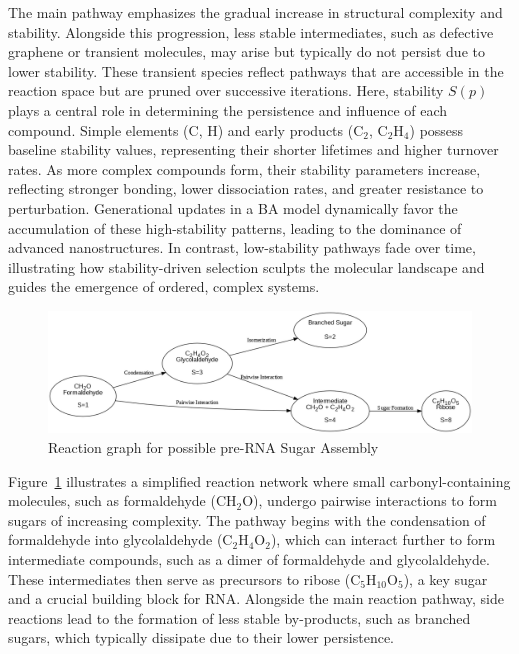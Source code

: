 \documentclass[entropy,article,submit,pdftex,moreauthors]{Definitions/mdpi}
\begin{document}
The main pathway emphasizes the gradual increase in structural complexity and stability. Alongside this progression, less stable intermediates, such as defective graphene or transient molecules, may arise but typically do not persist due to lower stability. These transient species reflect pathways that are accessible in the reaction space but are pruned over successive iterations. Here, stability \( S(p) \) plays a central role in determining the persistence and influence of each compound. Simple elements (\( \text{C} \), \( \text{H} \)) and early products (\( \text{C}_2 \), \( \text{C}_2\text{H}_4 \)) possess baseline stability values, representing their shorter lifetimes and higher turnover rates. As more complex compounds form, their stability parameters increase, reflecting stronger bonding, lower dissociation rates, and greater resistance to perturbation. Generational updates in a BA model dynamically favor the accumulation of these high-stability patterns, leading to the dominance of advanced nanostructures. In contrast, low-stability pathways fade over time, illustrating how stability-driven selection sculpts the molecular landscape and guides the emergence of ordered, complex systems.


\begin{figure}[h]
    \centering
    \includegraphics[width=1\textwidth,height=0.4\textwidth]{abc_prerna.png}
    \caption{Reaction graph for possible pre-RNA Sugar Assembly}
    \label{fig:abc_prerna}
\end{figure}

Figure~\ref{fig:abc_prerna} illustrates a simplified reaction network where small carbonyl-containing molecules, such as formaldehyde (CH$_2$O), undergo pairwise interactions to form sugars of increasing complexity. The pathway begins with the condensation of formaldehyde into glycolaldehyde (C$_2$H$_4$O$_2$), which can interact further to form intermediate compounds, such as a dimer of formaldehyde and glycolaldehyde. These intermediates then serve as precursors to ribose (C$_5$H$_{10}$O$_5$), a key sugar and a crucial building block for RNA. Alongside the main reaction pathway, side reactions lead to the formation of less stable by-products, such as branched sugars, which typically dissipate due to their lower persistence.
\end{document}
